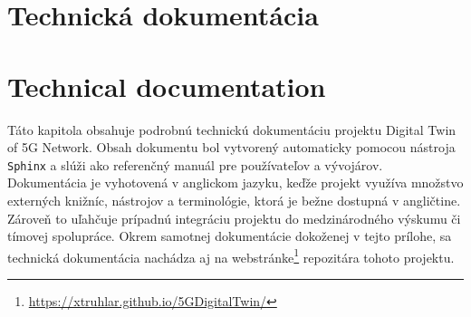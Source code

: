 \thispagestyle{empty}

\renewcommand*{\thepage}{D-\arabic{page}}

\ifx\FIITlagEN\undefined
\chapter{Technická dokumentácia}
\else
\chapter{Technical documentation}
\fi

\vspace{1em}
\noindent
Táto kapitola obsahuje podrobnú technickú dokumentáciu projektu Digital Twin of 5G Network. Obsah dokumentu bol vytvorený automaticky pomocou nástroja \texttt{Sphinx} a slúži ako referenčný manuál pre používateľov a vývojárov. Dokumentácia je vyhotovená v anglickom jazyku, keďže projekt využíva množstvo externých knižníc, nástrojov a terminológie, ktorá je bežne dostupná v angličtine. Zároveň to uľahčuje prípadnú integráciu projektu do medzinárodného výskumu či tímovej spolupráce. Okrem samotnej dokumentácie dokoženej v tejto prílohe, sa technická dokumentácia nachádza aj na webstránke\footnote{\url{https://xtruhlar.github.io/5GDigitalTwin/}} repozitára tohoto projektu. 

\setcounter{docpage}{1}





